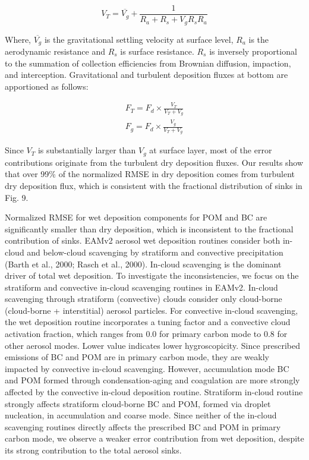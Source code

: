 \begin{equation}
V_{T} = \overline{V_{g}} + \frac{1}{R_{a}+R_{s}+V_{g}R_{s}R_{a}}
\end{equation}

Where, $\overline{V_{g}}$ is the gravitational settling velocity at surface level, $R_{a}$ is the aerodynamic resistance and $R_{s}$ is surface resistance. $R_{s}$ is inversely proportional to the summation of collection efficiencies from Brownian diffusion, impaction, and interception. Gravitational and turbulent deposition fluxes at bottom are apportioned as follows:

\begin{align}
    F_{T} = F_{d} \times \frac{V_{T}}{V_{T}+V_{g}} \\
    F_{g} = F_{d} \times \frac{V_{g}}{V_{T}+V_{g}}
\end{align}

Since $V_{T}$ is substantially larger than $V_{g}$ at surface layer, most of the error contributions originate from the turbulent dry deposition fluxes. Our results show that over 99\% of the normalized RMSE in dry deposition comes from turbulent dry deposition flux, which is consistent with the fractional distribution of sinks in Fig. 9.

Normalized RMSE for wet deposition components for POM and BC are significantly smaller than dry deposition, which is inconsistent to the fractional contribution of sinks. EAMv2 aerosol wet deposition routines consider both in-cloud and below-cloud scavenging by stratiform and convective precipitation (Barth et al., 2000; Rasch et al., 2000). In-cloud scavenging is the dominant driver of total wet deposition. To investigate the inconsistencies, we focus on the stratiform and convective in-cloud scavenging routines in EAMv2. In-cloud scavenging through stratiform (convective) clouds consider only cloud-borne (cloud-borne + interstitial) aerosol particles. For convective in-cloud scavenging, the wet deposition routine incorporates a tuning factor and a convective cloud activation fraction, which ranges from 0.0 for primary carbon mode to 0.8 for other aerosol modes. Lower value indicates lower hygroscopicity. Since prescribed emissions of BC and POM are in primary carbon mode, they are weakly impacted by convective in-cloud scavenging. However, accumulation mode BC and POM formed through condensation-aging and coagulation are more strongly affected by the convective in-cloud deposition routine. Stratiform in-cloud routine strongly affects stratiform cloud-borne BC and POM, formed via droplet nucleation, in accumulation and coarse mode. Since neither of the in-cloud scavenging routines directly affects the prescribed BC and POM in primary carbon mode, we observe a weaker error contribution from wet deposition, despite its strong contribution to the total aerosol sinks.

